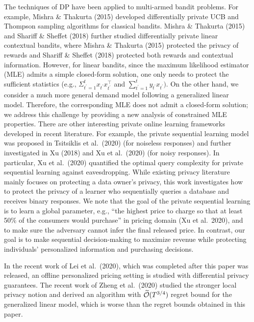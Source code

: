 The techniques of DP have been applied to multi-armed bandit problems. For example, Mishra \& Thakurta (2015) developed differentially private UCB and Thompson sampling algorithms for classical bandits. Mishra \& Thakurta (2015) and Shariff \& Sheffet (2018) further studied differentially private linear contextual bandits, where Mishra \& Thakurta (2015) protected the privacy of rewards and Shariff \& Sheffet (2018) protected both rewards and contextual information. However, for linear bandits, since the maximum likelihood estimator (MLE) admits a simple closed-form solution, one only needs to protect the sufficient statistics (e.g., \(\Sigma _ { t ^ { \prime } = 1 } ^ { t } x _ { t ^ { \prime } } x _ { t ^ { \prime } } ^ { \top }\) and \(\textstyle \sum _ { t ^ { \prime } = 1 } ^ { t } y _ { t ^ { \prime } } x _ { t ^ { \prime } } )\). On the other hand, we consider a much more general demand model following a generalized linear model. Therefore, the corresponding MLE does not admit a closed-form solution; we address this challenge by providing a new analysis of constrained MLE properties. There are other interesting private online learning frameworks developed in recent literature. For example, the private sequential learning model was proposed in Tsitsiklis et al.~(2020) (for noiseless responses) and further investigated in Xu (2018) and Xu et al.~(2020) (for noisy responses). In particular, Xu et al.~(2020) quantified the optimal query complexity for private sequential learning against eavesdropping. While existing privacy literature mainly focuses on protecting a data owner's privacy, this work investigates how to protect the privacy of a learner who sequentially queries a database and receives binary responses. We note that the goal of the private sequential learning is to learn a global parameter, e.g., ``the highest price to charge so that at least 50\% of the consumers would purchase'' in pricing domain (Xu et al.~2020), and to make sure the adversary cannot infer the final released price. In contrast, our goal is to make sequential decision-making to maximize revenue while protecting individuals' personalized information and purchasing decisions.

In the recent work of Lei et al.~(2020), which was completed after this paper was released, an offline personalized pricing setting is studied with differential privacy guarantees. The recent work of Zheng et al.~(2020) studied the stronger local privacy notion and derived an algorithm with \(\widetilde { \cal O } ( T ^ { 3 / 4 } )\) regret bound for the generalized linear model, which is worse than the regret bounds obtained in this paper.

